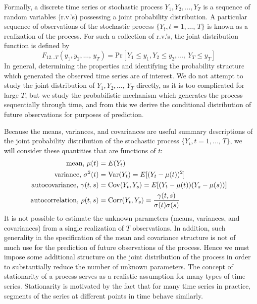 Formally, a discrete time series or stochastic process $Y_1, Y_2, \ldots, Y_T$ is a sequence of random variables (r.v.'s) possessing a joint probability distribution. A particular sequence of observations of the stochastic process $\{ Y_t, t=1, \ldots,  \, T\}$ is known as a realization of the process. For such a collection of r.v.'s, the joint distribution function is defined by
	\begin{equation} \label{eqn:feqnfirst}
	F_{12 \ldots T}\left(y_1, y_2, \ldots,  \, y_T\right)= \text{Pr}[Y_1 \leq y_1, Y_2 \leq y_2, \ldots,  	\, Y_T \leq y_T]
	\end{equation}
In general, determining the properties and identifying the probability structure which generated the observed time series are of interest. We do not attempt to study the joint distribution of $Y_1, Y_2, \ldots, \, Y_T$ directly, as it is too complicated for large $T$, but we study the probabilistic mechanism which generates the process sequentially through time, and from this we derive the conditional distribution of future observations for purposes of prediction.


Because the means, variances, and covariances are useful summary descriptions of the joint probability distribution of the stochastic process $\{ Y_t, t=1, \ldots,  \, T\}$, we will consider these quantities that are functions of $t$:
	\begin{equation} \label{eqn:texteqn}
	\begin{split}
	\text{mean, } \mu(t)&= E(Y_t) \\
	\text{variance, } \sigma^2(t)&= \var(Y_t)= E[(Y_t - \mu(t))^2] \\
	\text{autocovariance, } \gamma(t,s)&= \cov(Y_t,Y_s)= E[(Y_t-\mu(t))(Y_s - \mu(s))] \\
	\text{autocorrelation, } \rho(t,s)&= \corr(Y_t,Y_s)= \dfrac{\gamma(t,s)}{\sigma(t)\sigma(s)}
	\end{split}
	\end{equation}
It is not possible to estimate the unknown parameters (means, variances, and covariances) from a single realization of $T$ observations. In addition, such generality in the specification of the mean and covariance structure is not of much use for the prediction of future observations of the process. Hence we must impose some additional structure on the joint distribution of the process in order to substantially reduce the number of unknown parameters. The concept of stationarity of a process serves as a realistic assumption for many types of time series. Stationarity is motivated by the fact that for many time series in practice, segments of the series at different points in time behave similarly. \\


